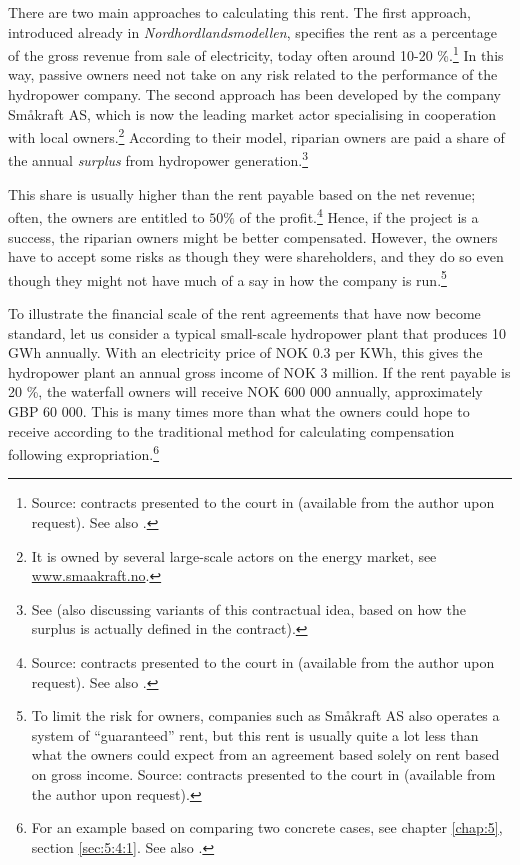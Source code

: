 There are two main approaches to calculating this rent. The first approach, introduced already in {\it Nordhordlandsmodellen}, specifies the rent as a percentage of the gross revenue from sale of electricity, today often around 10-20 \%.\footnote{Source: contracts presented to the court in \cite{sauda09} (available from the author upon request). See also \cite[55-57]{hauge15}.} In this way, passive owners need not take on any risk related to the performance of the hydropower company. The second approach has been developed by the company Småkraft AS, which is now the leading market actor specialising in cooperation with local owners.\footnote{It is owned by several large-scale actors on the energy market, see \url{www.smaakraft.no}.} According to their model, riparian owners are paid a share of the annual {\it surplus} from hydropower generation.\footnote{See \cite[57-60]{hauge15} (also discussing variants of this contractual idea, based on how the surplus is actually defined in the contract).}

This share is usually higher than the rent payable based on the net revenue; often, the owners are entitled to $50 \%$ of the profit.\footnote{Source: contracts presented to the court in \cite{sauda09} (available from the author upon request). See also \cite[58]{hauge15}.} Hence, if the project is a success, the riparian owners might be better compensated. However, the owners have to accept some risks as though they were shareholders, and they do so even though they might not have much of a say in how the company is run.\footnote{To limit the risk for owners, companies such as Småkraft AS also operates a system of ``guaranteed'' rent, but this rent is usually quite a lot less than what the owners could expect from an agreement based solely on rent based on gross income. Source: contracts presented to the court in \cite{sauda09} (available from the author upon request).}

To illustrate the financial scale of the rent agreements that have now become standard, let us consider a typical small-scale hydropower plant that produces 10 GWh annually. With an electricity price of NOK 0.3 per KWh, this gives the hydropower plant an annual gross income of NOK 3 million. If the rent payable is 20 \%, the waterfall owners will receive NOK 600 000 annually, approximately GBP 60 000. This is many times more than what the owners could hope to receive according to the traditional method for calculating compensation following expropriation.\footnote{For an example based on comparing two concrete cases, see chapter \ref{chap:5}, section \ref{sec:5:4:1}. See also \cite[283-289]{hauge15}.}

